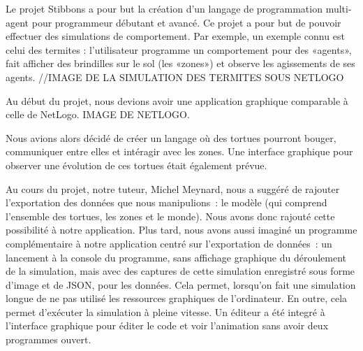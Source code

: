
Le projet Stibbons a pour but la création d'un langage de programmation multi-agent pour programmeur débutant et avancé.
Ce projet a pour but de pouvoir effectuer des simulations de comportement. Par exemple, un exemple connu est celui des termites : l'utilisateur programme un comportement pour des «agents», fait afficher des brindilles sur le sol (les «zones») et observe les agissements de ses agents.
//IMAGE DE LA SIMULATION DES TERMITES SOUS NETLOGO

Au début du projet, nous devions avoir une application graphique comparable à celle de NetLogo.
IMAGE DE NETLOGO.

Nous avions alors décidé de créer un langage où des tortues pourront bouger, communiquer entre elles et intéragir avec les zones. Une interface graphique pour observer une évolution de ces tortues était également prévue.

Au cours du projet, notre tuteur, Michel Meynard, nous a suggéré de rajouter l'exportation des données que nous manipulions~: le modèle (qui comprend l'ensemble des tortues, les zones et le monde). Nous avons donc rajouté cette possibilité à notre application.
Plus tard, nous avons aussi imaginé un programme complémentaire à notre application centré sur l'exportation de données~: un lancement à la console du programme, sans affichage graphique du déroulement de la simulation, mais avec des captures de cette simulation enregistré sous forme d'image et de JSON, pour les données.
Cela permet, lorsqu'on fait une simulation longue de ne pas utilisé les ressources graphiques de l'ordinateur. En outre, cela permet d'exécuter la simulation à pleine vitesse.
Un éditeur a été integré à l'interface graphique pour éditer le code et voir l'animation sans avoir deux programmes ouvert.
